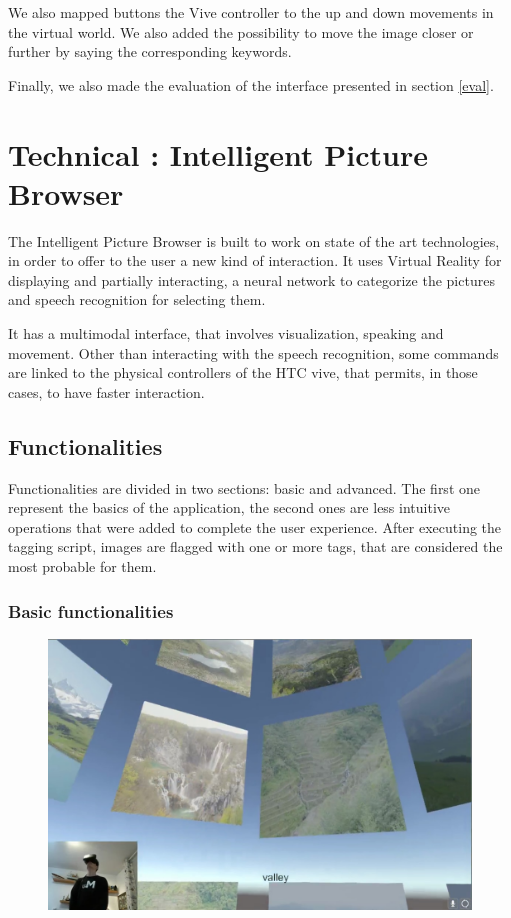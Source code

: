 \documentclass[11pt,a4paper]{article}
\begin{document}
We also mapped buttons the Vive controller to the up and down movements in the virtual world. We also added the possibility to move the image closer or further by saying the corresponding keywords. 

Finally, we also made the evaluation of the interface presented in section \ref{eval}.

\section{Technical : Intelligent Picture Browser}
The Intelligent Picture Browser is built to work on state of the art technologies, in order to offer to the user a new kind of interaction.
It uses Virtual Reality for displaying and partially interacting, a neural network to categorize the pictures and speech recognition for selecting them.

It has a multimodal interface, that involves visualization, speaking and movement.
Other than interacting with the speech recognition, some commands are linked to the physical controllers of the HTC vive, that permits, in those cases, to have faster interaction.

\subsection{Functionalities}
Functionalities are divided in two sections: basic and advanced.
The first one represent the basics of the application, the second ones are less intuitive operations that were added to complete the user experience.
After executing the tagging script, images are flagged with one or more tags, that are considered the most probable for them.

\subsubsection{Basic functionalities}

\begin{figure}[H]
  \label{fig:1tag}
  \centering
  \includegraphics[width=\textwidth]{img/SimpleTag.jpg}
\end{figure}
\end{document}
